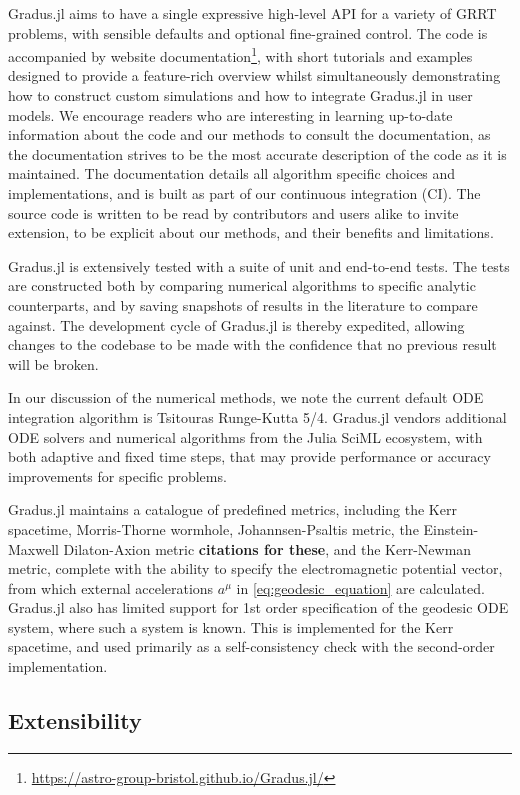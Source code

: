 \documentclass[fleqn,usenatbib]{mnras}
\newcommand{\todo}[1]{{\bf \color{red} #1}}
\newcommand{\Gradus}{Gradus.jl }
\begin{document}
\Gradus aims to have a single expressive high-level API for a variety of GRRT problems, with sensible defaults and optional fine-grained control. The code is accompanied by website documentation\footnote{\url{https://astro-group-bristol.github.io/Gradus.jl/}}, with short tutorials and examples designed to provide a feature-rich overview whilst simultaneously demonstrating how to construct custom simulations and how to integrate \Gradus in user models. We encourage readers who are interesting in learning up-to-date information about the code and our methods to consult the documentation, as the documentation strives to be the most accurate description of the code as it is maintained. The documentation details all algorithm specific choices and implementations, and is built as part of our continuous integration (CI). The source code is written to be read by contributors and users alike to invite extension, to be explicit about our methods, and their benefits and limitations.

\Gradus is extensively tested with a suite of unit and end-to-end tests. The tests are constructed both by comparing numerical algorithms to specific analytic counterparts, and by saving snapshots of results in the literature to compare against. The development cycle of \Gradus is thereby expedited, allowing changes to the codebase to be made with the confidence that no previous result will be broken.

In our discussion of the numerical methods, we note the current default ODE integration algorithm is Tsitouras Runge-Kutta 5/4. \Gradus vendors additional ODE solvers and numerical algorithms from the Julia SciML ecosystem, with both adaptive and fixed time steps, that may provide performance or accuracy improvements for specific problems.

\Gradus maintains a catalogue of predefined metrics, including the Kerr spacetime, Morris-Thorne wormhole, Johannsen-Psaltis metric, the Einstein-Maxwell Dilaton-Axion metric \todo{citations for these}, and the Kerr-Newman metric, complete with the ability to specify the electromagnetic potential vector, from which external accelerations $a^\mu$ in \eqref{eq:geodesic_equation} are calculated. \Gradus also has limited support for 1st order specification of the geodesic ODE system, where such a system is known. This is implemented for the Kerr spacetime, and used primarily as a self-consistency check with the second-order implementation.

\subsection{Extensibility}
\end{document}
